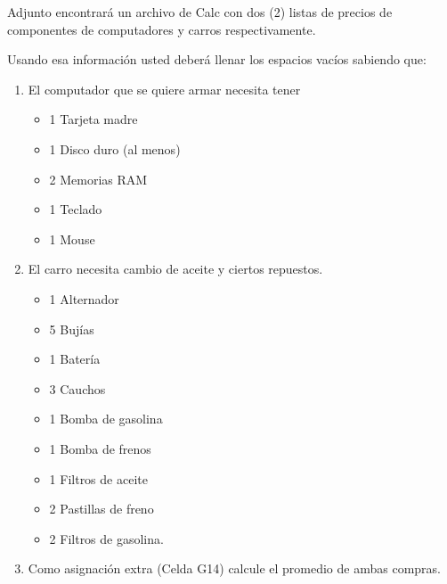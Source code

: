Adjunto encontrará un archivo de Calc con dos (2) listas de precios de componentes de computadores y carros respectivamente.

Usando esa información usted deberá llenar los espacios vacíos sabiendo que:
\begin{enumerate}
    \item El computador que se quiere armar necesita tener
    \begin{itemize}
        \item 1 Tarjeta madre
        \item 1 Disco duro (al menos)
        \item 2 Memorias RAM
        \item 1 Teclado
        \item 1 Mouse
    \end{itemize}
    \item El carro necesita cambio de aceite y ciertos repuestos.
    \begin{itemize}
        \item 1 Alternador
        \item 5 Bujías
        \item 1 Batería
        \item 3 Cauchos
        \item 1 Bomba de gasolina
        \item 1 Bomba de frenos
        \item 1 Filtros de aceite
        \item 2 Pastillas de freno
        \item 2 Filtros de gasolina.
    \end{itemize}
    \item Como asignación extra (Celda G14) calcule el promedio de ambas compras.
\end{enumerate}